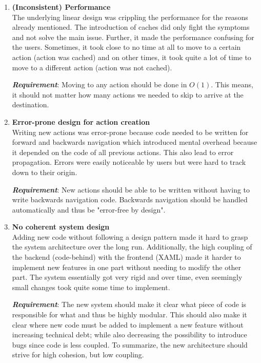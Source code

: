 \begin{enumerate}[wide, labelwidth=!, labelindent=0pt]
\setlength{\parskip}{0pt}

\item \textbf{(Inconsistent) Performance}\\
The underlying linear design was crippling the performance for the reasons already mentioned. The introduction of caches did only fight the symptoms and not solve the main issue. Further, it made the performance confusing for the users. Sometimes, it took close to no time at all to move to a certain action (action was cached) and on other times, it took quite a lot of time to move to a different action (action was not cached).

\noindent
\textit{\textbf{Requirement}}: Moving to any action should be done in $O(1)$. This means, it should not matter how many actions we needed to skip to arrive at the destination.

\item \textbf{Error-prone design for action creation}\\
Writing new actions was error-prone because code needed to be written for forward and backwards navigation which introduced mental overhead because it depended on the code of all previous actions. This also lead to error propagation. Errors were easily noticeable by users but were hard to track down to their origin.

\noindent
\textit{\textbf{Requirement}}: New actions should be able to be written without having to write backwards navigation code. Backwards navigation should be handled automatically and thus be "error-free by design".

\vfill
\pagebreak

\item \textbf{No coherent system design}\\
Adding new code without following a design pattern made it hard to grasp the system architecture over the long run. Additionally, the high coupling of the backend (code-behind) with the frontend (XAML) made it harder to implement new features in one part without needing to modify the other part. The system essentially got very rigid and over time, even seemingly small changes took quite some time to implement.

\noindent
\textit{\textbf{Requirement}}: The new system should make it clear what piece of code is responsible for what and thus be highly modular. This should also make it clear where new code must be added to implement a new feature without increasing technical debt; while also decreasing the possibility to introduce bugs since code is less coupled. To summarize, the new architecture should strive for high cohesion, but low coupling.
\end{enumerate}

